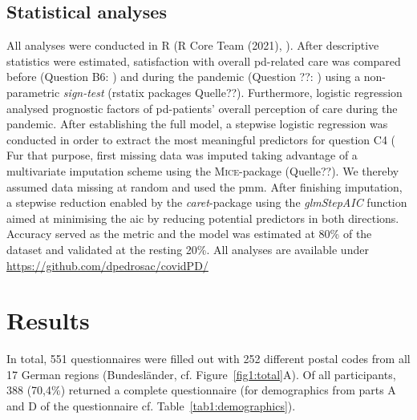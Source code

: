 \documentclass{bmcart}
\begin{document}
\subsection*{Statistical analyses}
All analyses were conducted in R (R Core Team (2021), \cite{rcore}). After descriptive statistics were estimated, satisfaction with overall \ac{pd}-related care was compared before (Question B6: ) and during the pandemic (Question ??: ) using a non-parametric \textit{sign-test} (rstatix packages Quelle??). Furthermore, logistic regression analysed prognostic factors of \ac{pd}-patients' overall perception of care during the pandemic. After establishing the full model, a stepwise logistic regression was conducted in order to extract the most meaningful predictors for question C4 ( %
Fur that purpose, first missing data was imputed taking advantage of a multivariate imputation scheme using the \textsc{Mice}-package (Quelle??). We thereby assumed data missing at random and used the \ac{pmm}. After finishing imputation, a stepwise reduction enabled by the \textit{caret}-package using the \textit{glmStepAIC} function aimed at minimising the \ac{aic} by reducing potential predictors in both directions. Accuracy served as the metric and the model was estimated at 80\% of the dataset and validated at the resting 20\%. All analyses are available under \url{https://github.com/dpedrosac/covidPD/}

\section*{Results}
In total, 551 questionnaires were filled out with 252 different postal codes from all 17 German regions (Bundesländer, cf. Figure~\ref{fig1:total}A). Of all participants, 388 (70,4$\%$) returned a complete questionnaire (for demographics from parts A and D of the questionnaire cf. Table~\ref{tab1:demographics}). 
\end{document}
